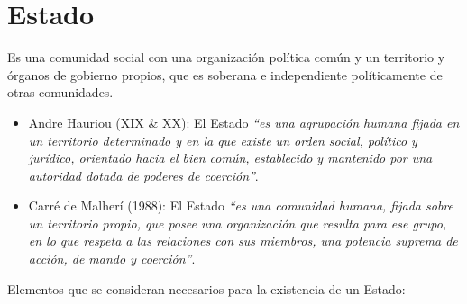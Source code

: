\documentclass{templateApunte}
\begin{document}
\section{Estado}
Es una comunidad social con una organización política común y un territorio y órganos de gobierno propios, que es soberana e independiente políticamente de otras comunidades.
\begin{itemize}
  \item Andre Hauriou (XIX \& XX): El Estado \textit{``es una agrupación humana fijada en un territorio determinado y en la que existe un orden social, político y jurídico, orientado hacia el bien común, establecido y mantenido por una autoridad dotada de poderes de coerción''}.
  \item Carr\'e de Malherí (1988):  El Estado \textit{``es una comunidad humana, fijada sobre un territorio propio, que posee una organización que resulta para ese grupo, en lo que respeta a las relaciones con sus miembros, una potencia suprema de acción, de mando y coerción''}.
\end{itemize}
Elementos que se consideran necesarios para la existencia de un Estado:
\end{document}
